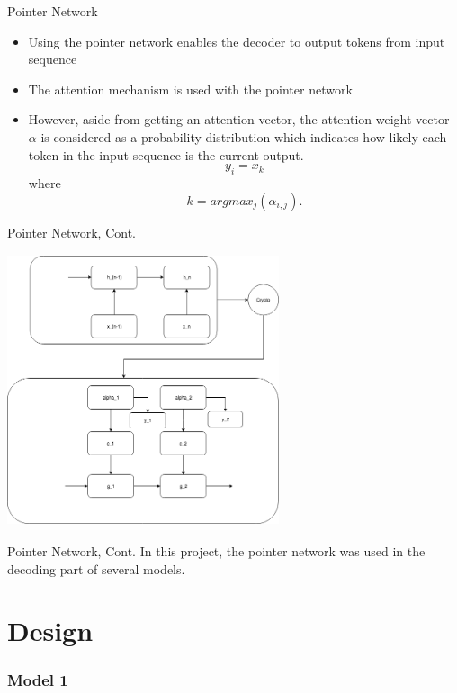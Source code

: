 \documentclass{beamer}
\begin{document}
\begin{frame}{Pointer Network}
    \begin{itemize}
        \item Using the pointer network enables the decoder to output tokens from input sequence
        \item The attention mechanism is used with the pointer network
        \item However, aside from getting an attention vector, the attention weight vector $\alpha$ is considered as a probability distribution which indicates how likely each token in the input sequence is the current output.
        $$y_i = x_k$$
        where
        $$k = argmax_j(\alpha _{i,j}).$$
    \end{itemize}
\end{frame}

\begin{frame}{Pointer Network, Cont.}
    \begin{center}
        \includegraphics[width=8cm, height=8cm]{figures/pointerNetwork.png}
    \end{center}

\end{frame}

\begin{frame}{Pointer Network, Cont.}
    In this project, the pointer network was used in the decoding part of several models.
\end{frame}
\section{Design}

\begin{frame} \frametitle{Model 1}

\end{frame}
\end{document}
